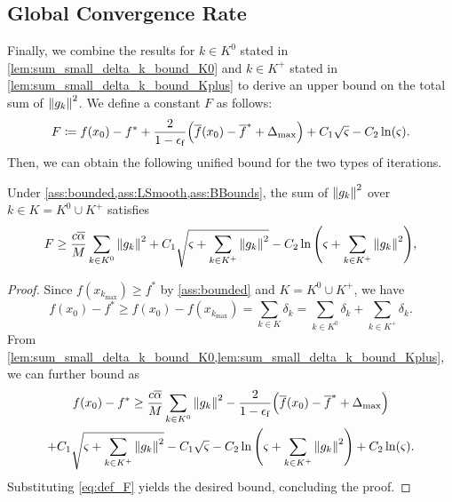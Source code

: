 \documentclass[journal_revised_MPC]{subfiles}
\begin{document}
\subsection{Global Convergence Rate}

Finally, we combine the results for $k \in K^0$ stated in \cref{lem:sum_small_delta_k_bound_K0} and $k \in K^+$ stated in \cref{lem:sum_small_delta_k_bound_Kplus} to derive an upper bound on the total sum of $\norm{g_k}^2$.
We define a constant $F$ as follows:
\begin{equation}
    F \coloneqq f(x_0) - f^* + \frac{2}{1-\epsilon_\mathrm{f}} \qty(\overline{f}(x_0) - \overline{f}^* + \Delta_{\max}) + C_1 \sqrt{\varsigma} - C_2 \ln(\varsigma).
    \label{eq:def_F}
\end{equation}
Then, we can obtain the following unified bound for the two types of iterations.
\begin{lemma}\label{lem:sum_norm_g_k_bound}
    Under \cref{ass:bounded,ass:LSmooth,ass:BBounds}, the sum of $\norm{g_{k}}^2$ over $k \in K=K^0\cup K^+$ satisfies
    \begin{equation*}
        F \ge
        \frac{c \overline{\alpha}}{M} \sum_{k \in K^0} \norm{g_{k}}^2 +
        C_1 \sqrt{\varsigma + \sum_{k \in K^+} \norm{g_{k}}^2} -
        C_2 \ln\qty(\varsigma+\sum_{k \in K^+} \norm{g_{k}}^2),
    \end{equation*}
\end{lemma}
\begin{proof}
    Since $f(x_{k_{\max}}) \ge f^*$ by \cref{ass:bounded} and $K=K^0 \cup K^+$, we have
    \begin{equation*}
        f(x_0) - f^* \geq f(x_0) - f(x_{k_{\max}}) = \sum_{k \in K} \delta_k = \sum_{k \in K^0} \delta_k + \sum_{k \in K^+} \delta_k.
    \end{equation*}
    From \cref{lem:sum_small_delta_k_bound_K0,lem:sum_small_delta_k_bound_Kplus}, we can further bound as
    \begin{multline*}
        f(x_0) - f^*
        \ge \frac{c \overline{\alpha}}{M} \sum_{k \in K^0} \norm{g_{k}}^2
        - \frac{2}{1-\epsilon_\mathrm{f}} \qty(\overline{f}(x_0) - \overline{f}^* + \Delta_{\max})\\
        +C_1 \sqrt{\varsigma + \sum_{k \in K^+} \norm{g_{k}}^2}
        - C_1 \sqrt{\varsigma}
        - C_2 \ln\qty(\varsigma+\sum_{k \in K^+} \norm{g_{k}}^2)
        + C_2 \ln(\varsigma).
    \end{multline*}
    Substituting \cref{eq:def_F} yields the desired bound, concluding the proof.
    \myQED
\end{proof}
\end{document}
